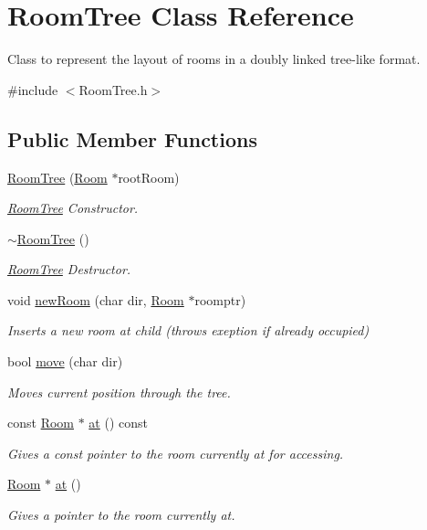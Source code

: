 \hypertarget{classRoomTree}{\section{Room\-Tree Class Reference}
\label{classRoomTree}
}


Class to represent the layout of rooms in a doubly linked tree-\/like format.  




{\ttfamily \#include $<$Room\-Tree.\-h$>$}

\subsection*{Public Member Functions}
\begin{DoxyCompactItemize}
\item 
\hyperlink{classRoomTree_a2ea4adb06c7a1913d21ebaa6548a0167}{Room\-Tree} (\hyperlink{classRoom}{Room} $\ast$root\-Room)
\begin{DoxyCompactList}\small\item\em \hyperlink{classRoomTree}{Room\-Tree} Constructor. \end{DoxyCompactList}\item 
\hypertarget{classRoomTree_a1bd0bf9ba15d59e29127f762a3cdf036}{\hyperlink{classRoomTree_a1bd0bf9ba15d59e29127f762a3cdf036}{$\sim$\-Room\-Tree} ()}\label{classRoomTree_a1bd0bf9ba15d59e29127f762a3cdf036}

\begin{DoxyCompactList}\small\item\em \hyperlink{classRoomTree}{Room\-Tree} Destructor. \end{DoxyCompactList}\item 
void \hyperlink{classRoomTree_a198fd76507d341091eff6f9cb367d551}{new\-Room} (char dir, \hyperlink{classRoom}{Room} $\ast$roomptr)
\begin{DoxyCompactList}\small\item\em Inserts a new room at child (throws exeption if already occupied) \end{DoxyCompactList}\item 
bool \hyperlink{classRoomTree_af3d5ff5c2c7722186283c69c9519cd14}{move} (char dir)
\begin{DoxyCompactList}\small\item\em Moves current position through the tree. \end{DoxyCompactList}\item 
const \hyperlink{classRoom}{Room} $\ast$ \hyperlink{classRoomTree_a077743215ed41e741fd4106b3d285693}{at} () const 
\begin{DoxyCompactList}\small\item\em Gives a const pointer to the room currently at for accessing. \end{DoxyCompactList}\item 
\hyperlink{classRoom}{Room} $\ast$ \hyperlink{classRoomTree_abfad141f868410fa8c578d19f45eaa05}{at} ()
\begin{DoxyCompactList}\small\item\em Gives a pointer to the room currently at. \end{DoxyCompactList}\end{DoxyCompactItemize}


